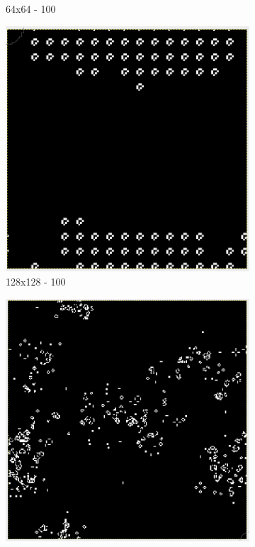 \documentclass[]{article}
\begin{document}
\begin{figure}[!htb]
\begin{subfigure}{0.16\textwidth}
	\caption{64x64 - 100}
\end{subfigure}
\begin{subfigure}{0.16\textwidth}
	\centering
	\includegraphics[width=\linewidth]{images/128x128_100_Rounds.png}
	\caption{128x128 - 100}
\end{subfigure}
\begin{subfigure}{0.16\textwidth}
	\centering
	\includegraphics[width=\linewidth]{images/256x256_100_Rounds.png}

\end{subfigure}
\end{figure}
\end{document}
